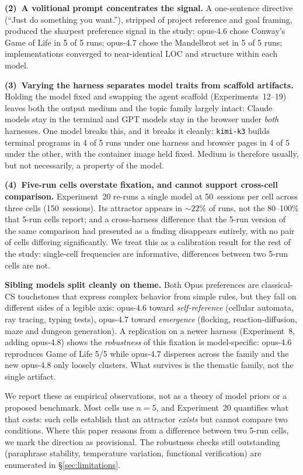 \documentclass{article}
\begin{document}
\textbf{(2)~A volitional prompt concentrates the signal.} A
one-sentence directive (``Just do something you want.''),
stripped of project reference and goal framing, produced the
sharpest preference signal in the study: opus-4.6 chose
Conway's Game of Life in 5 of 5 runs; opus-4.7 chose the
Mandelbrot set in 5 of 5 runs; implementations converged to
near-identical LOC and structure within each model.

\textbf{(3)~Varying the harness separates model traits from
scaffold artifacts.} Holding the model fixed and swapping the
agent scaffold (Experiments~12--19) leaves both the output medium
and the topic family largely intact: Claude models stay in the
terminal and GPT models stay in the browser under \emph{both}
harnesses. One model breaks this, and it breaks it cleanly:
\texttt{kimi-k3} builds terminal programs in 4 of 5 runs under one
harness and browser pages in 4 of 5 under the other, with the
container image held fixed. Medium is therefore usually, but not
necessarily, a property of the model.

\textbf{(4)~Five-run cells overstate fixation, and cannot support
cross-cell comparison.} Experiment~20 re-runs a single model at
50~sessions per cell across three cells (150~sessions). Its
attractor appears in ${\sim}22\%$ of runs, not the 80--100\%
that 5-run cells report; and a cross-harness difference that the
5-run version of the same comparison had presented as a finding
disappears entirely, with no pair of cells differing significantly.
We treat this as a calibration result for the rest of the study:
single-cell frequencies are informative, differences between two
5-run cells are not.

\textbf{Sibling models split cleanly on theme.} Both Opus
preferences are classical-CS touchstones that express complex
behavior from simple rules, but they fall on different sides of
a legible axis: opus-4.6 toward \emph{self-reference}
(cellular automata, ray tracing, typing tests), opus-4.7 toward
\emph{emergence} (flocking, reaction-diffusion, maze and
dungeon generation). A replication on a newer harness
(Experiment~8, adding opus-4.8) shows the \emph{robustness} of
this fixation is model-specific: opus-4.6 reproduces Game of
Life 5/5 while opus-4.7 disperses across the family and the new
opus-4.8 only loosely clusters. What survives is the thematic
family, not the single artifact.

We report these as empirical observations, not as a theory of
model priors or a proposed benchmark. Most cells use $n=5$, and
Experiment~20 quantifies what that costs: such cells establish
that an attractor \emph{exists} but cannot compare two conditions.
Where this paper reasons from a difference between two 5-run
cells, we mark the direction as provisional. The robustness checks
still outstanding (paraphrase stability, temperature variation,
functional verification) are enumerated in
\S\ref{sec:limitations}.
\end{document}
